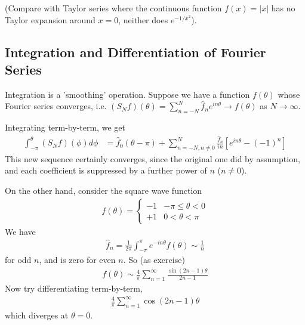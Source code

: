 \documentclass[a4paper]{article}
\begin{document}
(Compare with Taylor series where the continuous function $f\left(x\right) = |x|$ has no Taylor expansion around $x=0$, neither does $e^{-1/x^2}$).

\subsection{Integration and Differentiation of Fourier Series}
Integration is a 'smoothing' operation. Suppose we have a function $f\left(\theta\right)$ whose Fourier series converges, i.e. $\left(S_N f\right) \left(\theta\right) = \sum_{n=-N}^N \hat{f}_n e^{in\theta} \to f\left(\theta\right)$ as $N \to \infty$.

Integrating term-by-term, we get
\begin{equation*}
\begin{aligned}
\int_{-\pi}^\theta \left(S_N f\right) \left(\phi\right) d\phi &= \hat{f}_0 \left(\theta-\pi\right) + \sum_{n=-N,n \neq 0}^N \frac{\hat{f}_n}{in}\left[e^{in\theta} - \left(-1\right)^n\right]
\end{aligned}
\end{equation*}
This new sequence certainly converges, since the original one did by assumption, and each coefficient is suppressed by a further power of $n$ ($n \neq 0$).

On the other hand, consider the square wave function
\begin{equation*}
\begin{aligned}
f\left(\theta\right) = \left\{
\begin{array}{ll}
-1 & -\pi \leq \theta < 0\\
+1 & 0 < \theta < \pi
\end{array}
\right.
\end{aligned}
\end{equation*}
We have
\begin{equation*}
\begin{aligned}
\hat{f}_n = \frac{1}{2\pi} \int_{-\pi}^\pi e^{-in\theta} f\left(\theta\right) \sim \frac{1}{n}
\end{aligned}
\end{equation*}
for odd $n$, and is zero for even $n$. So (as exercise)
\begin{equation*}
\begin{aligned}
f\left(\theta\right) \sim \frac{4}{\pi} \sum_{n=1}^\infty \frac{\sin\left(2n-1\right)\theta}{2n-1}
\end{aligned}
\end{equation*}
Now try differentiating term-by-term,
\begin{equation*}
\begin{aligned}
\frac{4}{\pi}\sum_{n=1}^\infty \cos\left(2n-1\right)\theta
\end{aligned}
\end{equation*}
which diverges at $\theta = 0$.
\end{document}
